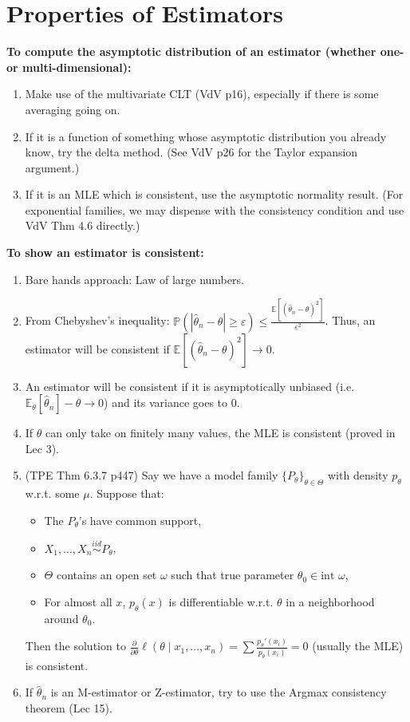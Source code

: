 \documentclass[twoside]{article}
\newcommand{\dis}{\displaystyle}
\newcommand\bbE{\mathbb{E}}
\newcommand\bbP{\mathbb{P}}
\def\eps{\varepsilon}
\newcommand\om{\omega}
\def\t{\theta}
\newcommand\T{\Theta}
\newcommand\goesto{\rightarrow}
\begin{document}
\section{Properties of Estimators}
\textbf{To compute the asymptotic distribution of an estimator (whether one- or multi-dimensional):}
\begin{enumerate}
\item Make use of the multivariate CLT (VdV p16), especially if there is some averaging going on.

\item If it is a function of something whose asymptotic distribution you already know, try the delta method. (See VdV p26 for the Taylor expansion argument.)

\item If it is an MLE which is consistent, use the asymptotic normality result. (For exponential families, we may dispense with the consistency condition and use VdV Thm 4.6 directly.)

\end{enumerate}

\textbf{To show an estimator is consistent:}
\begin{enumerate}
\item Bare hands approach: Law of large numbers.

\item From Chebyshev's inequality: $\bbP(|\hat{\t}_n - \t| \geq \eps) \leq \dis\frac{\bbE [(\hat{\t}_n - \t)^2]}{\eps^2}$. Thus, an estimator will be consistent if $\bbE [(\hat{\t}_n - \t)^2] \goesto 0$.

\item An estimator will be consistent if it is asymptotically unbiased (i.e. $\bbE_\t [\hat{\t}_n] - \t \goesto 0$) and its variance goes to 0.

\item If $\t$ can only take on finitely many values, the MLE is consistent (proved in Lec 3).

\item (TPE Thm 6.3.7 p447) Say we have a model family $\{ P_\t\}_{\t \in \T}$ with density $p_\t$ w.r.t. some $\mu$. Suppose that: 
\begin{itemize}
\item The $P_\t$'s have common support, 
\item $X_1, \dots, X_n \stackrel{iid}{\sim} P_\t$,
\item $\T$ contains an open set $\om$ such that true parameter $\t_0 \in \text{int } \om$,
\item For almost all $x$, $p_\t(x)$ is differentiable w.r.t. $\t$ in a neighborhood around $\t_0$.
\end{itemize}
Then the solution to $\dis\frac{\partial}{\partial \t}\ell(\t \mid x_1, \dots, x_n) = \dis\sum\frac{p_\t'(x_i)}{p_\t(x_i)} = 0$ (usually the MLE) is consistent.

\item If $\hat{\t}_n$ is an M-estimator or Z-estimator, try to use the Argmax consistency theorem (Lec 15).

\end{enumerate}
\end{document}
